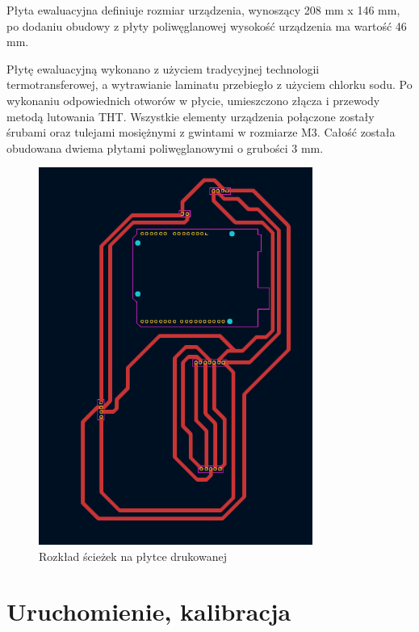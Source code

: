 Płyta ewaluacyjna definiuje rozmiar urządzenia, wynoszący 208 mm x 146 mm,
po dodaniu obudowy z płyty poliwęglanowej wysokość urządzenia ma wartość 46 mm.

\vspace{12pt}

Płytę ewaluacyjną wykonano z użyciem tradycyjnej technologii termotransferowej, a wytrawianie laminatu przebiegło z użyciem chlorku sodu. Po wykonaniu odpowiednich otworów w płycie, umieszczono złącza i przewody metodą lutowania THT. Wszystkie elementy urządzenia połączone zostały śrubami oraz tulejami mosiężnymi z gwintami w rozmiarze M3. Całość została obudowana dwiema płytami poliwęglanowymi o grubości 3 mm.

\begin{figure}[h!]
    \centering
    \includegraphics[width=0.8\textwidth]{images/layout.png}
    \caption{Rozkład ścieżek na płytce drukowanej}
    \label{fig:twoj_obrazek}
\end{figure}

\chapter{Uruchomienie, kalibracja}

